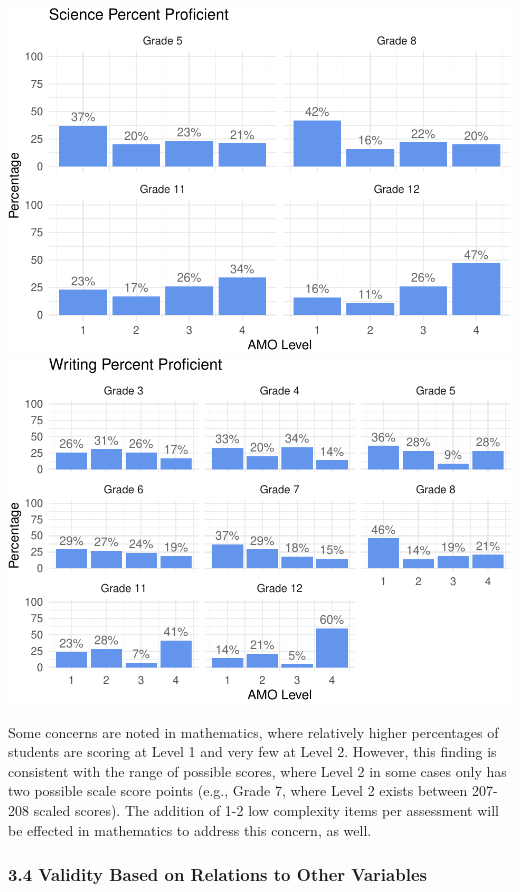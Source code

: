 \documentclass[]{article}
\begin{document}
\includegraphics{Critical_Element_3_files/figure-latex/amo_plot-4.pdf}
\includegraphics{Critical_Element_3_files/figure-latex/amo_plot-5.pdf}

Some concerns are noted in mathematics, where relatively higher
percentages of students are scoring at Level 1 and very few at Level 2.
However, this finding is consistent with the range of possible scores,
where Level 2 in some cases only has two possible scale score points
(e.g., Grade 7, where Level 2 exists between 207-208 scaled scores). The
addition of 1-2 low complexity items per assessment will be effected in
mathematics to address this concern, as well.

\hypertarget{validity-based-on-relations-to-other-variables}{%
\subsubsection{3.4 Validity Based on Relations to Other
Variables}\label{validity-based-on-relations-to-other-variables}}
\end{document}
